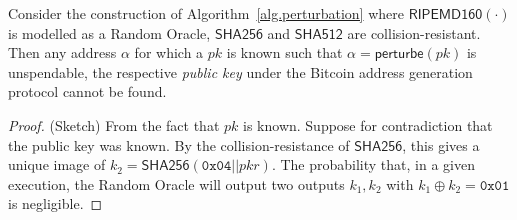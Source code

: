 \begin{lemma}[Unspendability]
  Consider the construction of Algorithm~\ref{alg.perturbation} where
  $\textsf{RIPEMD160}(\cdot)$ is modelled as a Random Oracle, $\textsf{SHA256}$
  and $\textsf{SHA512}$  are collision-resistant. Then any address $\alpha$ for
  which a $pk$ is known such that $\alpha = \textsf{perturbe}(pk)$ is
  unspendable, the respective \emph{public key} under the Bitcoin address
  generation protocol cannot be found.
\end{lemma}
\begin{proof}(Sketch)
  From the fact that $pk$ is known.
  Suppose for contradiction that the public key was known.
  By the collision-resistance of $\textsf{SHA256}$, this gives a unique image of
  $k_2 = \textsf{SHA256}(\texttt{0x04} || pkr)$.
  The probability that, in a given execution, the Random Oracle will output two
  outputs $k_1, k_2$ with $k_1 \oplus k_2 = \texttt{0x01}$ is negligible.
\end{proof}

